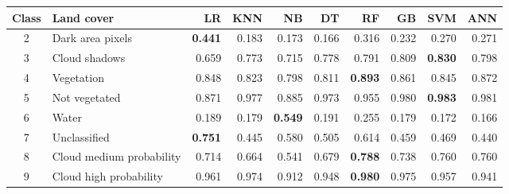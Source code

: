 \begin{tabular}{clrrrrrrrr}
\toprule
Class & Land cover & LR & KNN & NB & DT & RF & GB & SVM & ANN \\
\midrule
2 & Dark area pixels & \textbf{0.441} & 0.183 & 0.173 & 0.166 & 0.316 & 0.232 & 0.270 & 0.271 \\
3 & Cloud shadows & 0.659 & 0.773 & 0.715 & 0.778 & 0.791 & 0.809 & \textbf{0.830} & 0.798 \\
4 & Vegetation & 0.848 & 0.823 & 0.798 & 0.811 & \textbf{0.893} & 0.861 & 0.845 & 0.872 \\
5 & Not vegetated & 0.871 & 0.977 & 0.885 & 0.973 & 0.955 & 0.980 & \textbf{0.983} & 0.981 \\
6 & Water & 0.189 & 0.179 & \textbf{0.549} & 0.191 & 0.255 & 0.179 & 0.172 & 0.166 \\
7 & Unclassified & \textbf{0.751} & 0.445 & 0.580 & 0.505 & 0.614 & 0.459 & 0.469 & 0.440 \\
8 & Cloud medium probability & 0.714 & 0.664 & 0.541 & 0.679 & \textbf{0.788} & 0.738 & 0.760 & 0.760 \\
9 & Cloud high probability & 0.961 & 0.974 & 0.912 & 0.948 & \textbf{0.980} & 0.975 & 0.957 & 0.941 \\
\bottomrule
\end{tabular}
